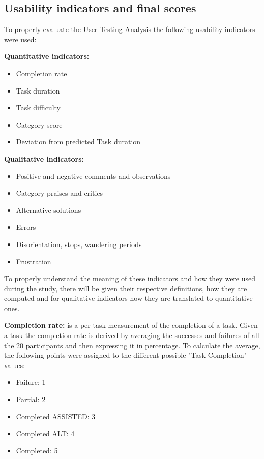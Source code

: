 
\subsection{Usability indicators and final scores}
\label{subsec:resultsUT}
To properly evaluate the User Testing Analysis the following usability indicators were used:\\

\vspace{0.05cm}

\noindent\textbf{Quantitative indicators:}
\begin{itemize}
	\item Completion rate
	\item Task duration
	\item Task difficulty
	\item Category score
	\item Deviation from predicted Task duration
\end{itemize}

\noindent\textbf{Qualitative indicators:}
\begin{itemize}
	\item Positive and negative comments and observations
	\item Category praises and critics
	\item Alternative solutions
	\item Errors
	\item Disorientation, stops, wandering periods
	\item Frustration
\end{itemize}

\vspace{0.5cm}

To properly understand the meaning of these indicators and how they were used during the study, there will be given their respective definitions, how they are computed and for qualitative indicators how they are translated to quantitative ones.

\vspace{0.25cm}

\textbf{Completion rate:} is a per task measurement of the completion of a task. Given a task the completion rate is derived by averaging the successes and failures of all the 20 participants and then expressing it in percentage. To calculate the average, the following points were assigned to the different possible "Task Completion" values:
\begin{itemize}
	\item Failure: 1
	\item Partial: 2
	\item Completed ASSISTED: 3
	\item Completed ALT: 4
	\item Completed: 5
\end{itemize}

